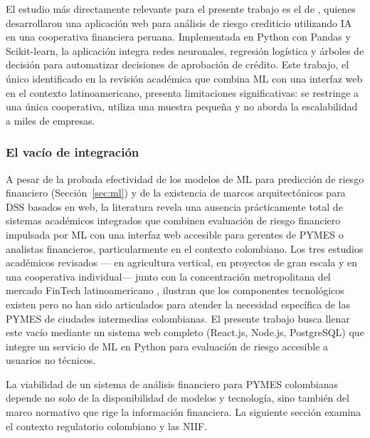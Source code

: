 \documentclass[12pt, letterpaper]{article}
\begin{document}
El estudio m\'as directamente relevante para el presente trabajo es el de \citet{MayorgaLira2023}, quienes desarrollaron una aplicaci\'on web para an\'alisis de riesgo crediticio utilizando IA en una cooperativa financiera peruana. Implementada en Python con Pandas y Scikit-learn, la aplicaci\'on integra redes neuronales, regresi\'on log\'istica y \'arboles de decisi\'on para automatizar decisiones de aprobaci\'on de cr\'edito. Este trabajo, el \'unico identificado en la revisi\'on acad\'emica que combina ML con una interfaz web en el contexto latinoamericano, presenta limitaciones significativas: se restringe a una \'unica cooperativa, utiliza una muestra peque\~na y no aborda la escalabilidad a miles de empresas.

\subsubsection{El vac\'io de integraci\'on}

A pesar de la probada efectividad de los modelos de ML para predicci\'on de riesgo financiero (Secci\'on~\ref{sec:ml}) y de la existencia de marcos arquitect\'onicos para DSS basados en web, la literatura revela una ausencia pr\'acticamente total de sistemas acad\'emicos integrados que combinen evaluaci\'on de riesgo financiero impulsada por ML con una interfaz web accesible para gerentes de PYMES o analistas financieros, particularmente en el contexto colombiano. Los tres estudios acad\'emicos revisados ---\citet{BaumontDeOliveira2021} en agricultura vertical, \citet{Sholapurapu2024} en proyectos de gran escala y \citet{MayorgaLira2023} en una cooperativa individual--- junto con la concentraci\'on metropolitana del mercado FinTech latinoamericano \citep{Ioannou2022}, ilustran que los componentes tecnol\'ogicos existen pero no han sido articulados para atender la necesidad espec\'ifica de las PYMES de ciudades intermedias colombianas. El presente trabajo busca llenar este vac\'io mediante un sistema web completo (React.js, Node.js, PostgreSQL) que integre un servicio de ML en Python para evaluaci\'on de riesgo accesible a usuarios no t\'ecnicos.

La viabilidad de un sistema de an\'alisis financiero para PYMES colombianas depende no solo de la disponibilidad de modelos y tecnolog\'ia, sino tambi\'en del marco normativo que rige la informaci\'on financiera. La siguiente secci\'on examina el contexto regulatorio colombiano y las NIIF.

\end{document}
